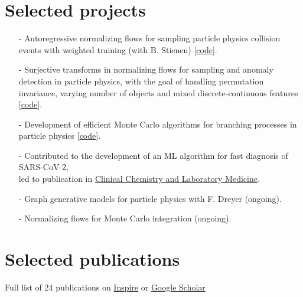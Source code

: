 \documentclass[a4paper,12pt]{article}
\begin{document}
\section{Selected projects}
\begin{itemize}[nosep,after=\strut, leftmargin=1em]
    \item[-] Autoregressive normalizing flows for sampling particle physics collision events with weighted training (with B. Stienen) [\href{https://github.com/rbvh/PhaseSpaceAutoregressiveFlow}{code}].
    \item[-] Surjective transforms in normalizing flows for sampling and anomaly detection in particle physics, with the goal of handling permutation invariance, varying number of objects and mixed discrete-continuous features [\href{https://github.com/rbvh/surflows}{code}].
    \item[-] Development of efficient Monte Carlo algorithms for branching processes in particle physics [\href{https://github.com/rbvh/Veto-Algorithm-Toy-Shower}{code}].
    \item[-] Contributed to the development of an ML algorithm for fast diagnosis of SARS-CoV-2, \\ led to publication in \href{https://www.degruyter.com/document/doi/10.1515/cclm-2020-0593/html}{Clinical Chemistry and Laboratory Medicine}.
    \item[-] Graph generative models for particle physics with F. Dreyer (ongoing).
    \item[-] Normalizing flows for Monte Carlo integration (ongoing).
\end{itemize}

\newpage

\section{Selected publications}
Full list of 24 publications on \href{https://inspirehep.net/authors/1777870?ui-citation-summary=true}{Inspire} or \href{https://scholar.google.com/citations?user=MRTAm7UAAAAJ&hl=en&oi=ao}{Google Scholar}
\end{document}
